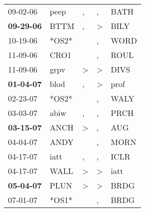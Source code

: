 \begin{supertabular}{p{0.07\textwidth}p{0.06\textwidth}p{0.02\textwidth}p{0.02\textwidth}p{0.06\textwidth}}
          09-02-06\textsuperscript{} &           peep\textsuperscript{} &                , &                , &           BATH\textsuperscript{} \\
 \textbf{09-29-06\textsuperscript{}} &           BTTM\textsuperscript{} &                , &     \textgreater &           BILY\textsuperscript{} \\
          10-19-06\textsuperscript{} &                            *OS2* &                  &                , &           WORD\textsuperscript{} \\
          11-09-06\textsuperscript{} &           CRO1\textsuperscript{} &                  &                , &           ROUL\textsuperscript{} \\
          11-09-06\textsuperscript{} &           grpv\textsuperscript{} &     \textgreater &     \textgreater &           DIVS\textsuperscript{} \\
 \textbf{01-04-07\textsuperscript{}} &           blod\textsuperscript{} &                , &     \textgreater &           prof\textsuperscript{} \\
          02-23-07\textsuperscript{} &                            *OS2* &                  &                , &           WALY\textsuperscript{} \\
          03-03-07\textsuperscript{} &           abiw\textsuperscript{} &                , &                , &           PRCH\textsuperscript{} \\
 \textbf{03-15-07\textsuperscript{}} &           ANCH\textsuperscript{} &     \textgreater &                , &            AUG\textsuperscript{} \\
          04-04-07\textsuperscript{} &           ANDY\textsuperscript{} &                  &                , &           MORN\textsuperscript{} \\
          04-17-07\textsuperscript{} &           iatt\textsuperscript{} &                , &                , &           ICLR\textsuperscript{} \\
          04-17-07\textsuperscript{} &           WALL\textsuperscript{} &     \textgreater &     \textgreater &           iatt\textsuperscript{} \\
 \textbf{05-04-07\textsuperscript{}} &           PLUN\textsuperscript{} &     \textgreater &     \textgreater &           BRDG\textsuperscript{} \\
          07-01-07\textsuperscript{} &                            *OS1* &                  &                , &           BRDG\textsuperscript{} \\

\end{supertabular}
